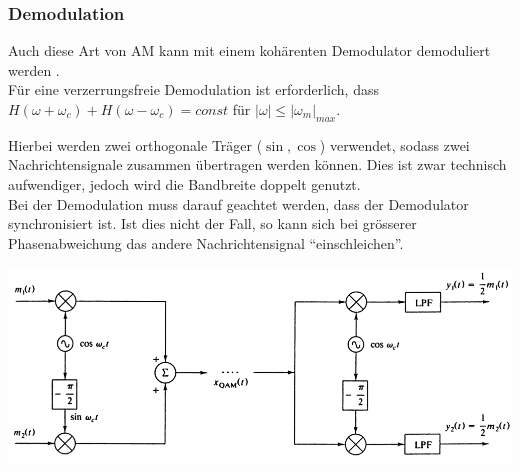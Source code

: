 \subsubsection{Demodulation}
Auch diese Art von AM kann mit einem kohärenten Demodulator demoduliert
werden .\\
Für eine verzerrungsfreie Demodulation ist erforderlich, dass $H(\omega +
\omega_c) + H(\omega - \omega_c) = const$ für $|\omega| \leq |\omega_m|_{max}$.



Hierbei werden zwei orthogonale Träger ($\sin, \cos$) verwendet, sodass zwei Nachrichtensignale
zusammen übertragen werden können. Dies ist zwar technisch aufwendiger, jedoch wird die Bandbreite
doppelt genutzt. \\
Bei der Demodulation muss darauf geachtet werden, dass der Demodulator synchronisiert ist. Ist dies
nicht der Fall, so kann sich bei grösserer Phasenabweichung das andere Nachrichtensignal
``einschleichen''.
\begin{center}
    \includegraphics[width=14cm]{bilder/am_qam_modulatorDemodulator.png}
\end{center}